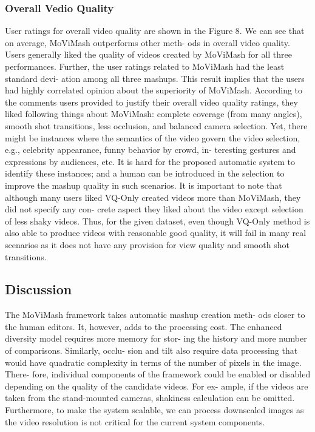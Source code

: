 \documentclass{sig-alternate}
\begin{document}
\subsubsection{Overall Vedio Quality}
User ratings for overall video quality are shown in the Figure 8.
We can see that on average, MoViMash outperforms other meth-
ods in overall video quality. Users generally liked the quality of
videos created by MoViMash for all three performances. Further,
the user ratings related to MoViMash had the least standard devi-
ation among all three mashups. This result implies that the users
had highly correlated opinion about the superiority of MoViMash.
According to the comments users provided to justify their overall
video quality ratings, they liked following things about MoViMash:
complete coverage (from many angles), smooth shot transitions,
less occlusion, and balanced camera selection. Yet, there might
be instances where the semantics of the video govern the video
selection, e.g., celebrity appearance, funny behavior by crowd, in-
teresting gestures and expressions by audiences, etc. It is hard for
the proposed automatic system to identify these instances; and a
human can be introduced in the selection to improve the mashup
quality in such scenarios.
It is important to note that although many users liked VQ-Only
created videos more than MoViMash, they did not specify any con-
crete aspect they liked about the video except selection of less
shaky videos. Thus, for the given dataset, even though VQ-Only
method is also able to produce videos with reasonable good quality,
it will fail in many real scenarios as it does not have any provision
for view quality and smooth shot transitions.

\subsection{Discussion}
The MoViMash framework takes automatic mashup creation meth-
ods closer to the human editors. It, however, adds to the processing
cost. The enhanced diversity model requires more memory for stor-
ing the history and more number of comparisons. Similarly, occlu-
sion and tilt also require data processing that would have quadratic
complexity in terms of the number of pixels in the image. There-
fore, individual components of the framework could be enabled or
disabled depending on the quality of the candidate videos. For ex-
ample, if the videos are taken from the stand-mounted cameras,
shakiness calculation can be omitted. Furthermore, to make the
system scalable, we can process downscaled images as the video
resolution is not critical for the current system components.
\end{document}
